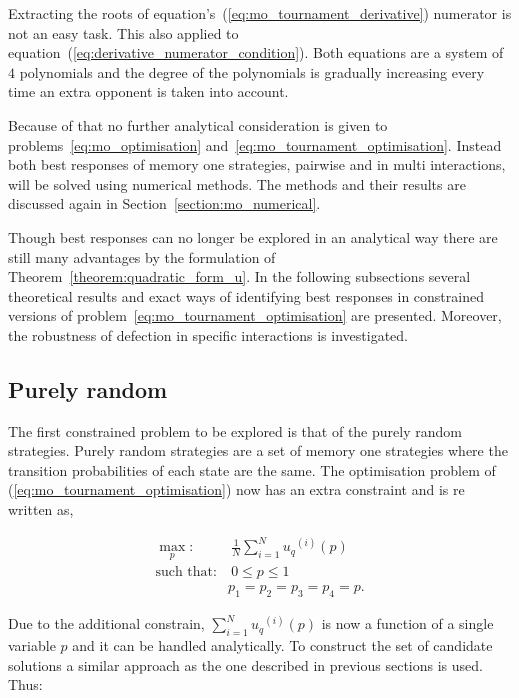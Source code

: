 \documentclass[10pt]{article}
\begin{document}
Extracting the roots of equation's~(\ref{eq:mo_tournament_derivative}) numerator
is not an easy task. This also applied to equation~(\ref{eq:derivative_numerator_condition}).
Both equations are a system of \(4\) polynomials and the degree of the polynomials
is gradually increasing every time an extra opponent is taken into account.

Because of that no further analytical consideration is given to problems~\ref{eq:mo_optimisation}
and~\ref{eq:mo_tournament_optimisation}. Instead both best responses of memory one
strategies, pairwise and in multi interactions, will be solved using numerical
methods. The methods and their results are discussed again in Section~\ref{section:mo_numerical}.

Though best responses can no longer be explored in an analytical way
there are still many advantages by the formulation of Theorem~\ref{theorem:quadratic_form_u}.
In the following subsections several theoretical results and exact ways of identifying
best responses in constrained versions of problem~\ref{eq:mo_tournament_optimisation} are presented.
Moreover, the robustness of defection in specific interactions is investigated.

\subsection{Purely random}\label{section:purely_analytical}

The first constrained problem to be explored is that of the purely random strategies.
Purely random strategies are a set of memory one strategies where the transition
probabilities of each state are the same. The optimisation problem of (\ref{eq:mo_tournament_optimisation})
now has an extra constraint and is re written as,

\begin{equation}\label{eq:random_optimisation}
\begin{aligned}
\max_p: & \ \frac{1}{N} \sum_{i=1} ^ {N} {u_q}^{(i)} (p) 
\\
\text{such that}: & \ 0 \leq p \leq 1 \\
                  & p_1 = p_2 = p_3 = p_4 = p.
\end{aligned}
\end{equation}

Due to the additional constrain, \(\sum\limits_{i=1} ^ {N} {u_q}^{(i)} (p) \) is now a function of a single
variable \(p\) and it can be handled analytically. To construct the set of candidate
solutions a similar approach as the one described in previous sections is used. Thus:
\end{document}
